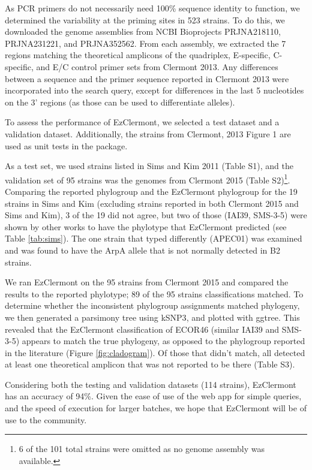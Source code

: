 As PCR primers do not necessarily need 100\% sequence identity to function, we determined the variability at the priming sites in 523 strains. To do this, we downloaded the genome assemblies from NCBI Bioprojects PRJNA218110, PRJNA231221, and PRJNA352562.  From each assembly, we extracted the 7 regions matching the theoretical amplicons of the quadriplex, E-specific, C-specific, and E/C control primer sets from Clermont 2013.  Any differences between a sequence and the primer sequence reported in Clermont 2013 were incorporated into the search query, except for differences in the last 5 nucleotides on the 3’ regions (as those can be used to differentiate alleles)\cite{Stadhouders2010}.

To assess the performance of EzClermont, we selected a test dataset and a validation dataset.  Additionally, the strains from Clermont, 2013 Figure 1 are used as unit tests in the package.

As a test set, we used strains listed in Sims and Kim 2011\cite{Sims2011} (Table S1), and the validation set of 95 strains was the genomes from Clermont 2015\cite{Denamur2015} (Table S2)\footnote{6 of the 101 total strains were omitted as no genome assembly was available.}.  Comparing the reported phylogroup and the EzClermont phylogroup for the 19 strains in Sims and Kim (excluding strains reported in both Clermont 2015 and Sims and Kim),  3 of the 19 did not agree, but two of those (IAI39, SMS-3-5) were shown by other works to have the phylotype that EzClermont predicted (see Table \ref{tab:sims}).  The one strain that typed differently (APEC01) was examined and was found to have the ArpA allele that is not normally detected in B2 strains.





We ran EzClermont on the 95 strains from Clermont 2015 and compared the results to the reported phylotype; 89 of the 95 strains classifications matched.  To determine whether the inconsistent phylogroup assignments matched phylogeny, we then generated a parsimony tree using kSNP3\cite{Gardner2015a}, and plotted with ggtree\cite{Yu2017a}. This revealed that the EzClermont classification of ECOR46 (similar IAI39 and SMS-3-5) appears to match the true phylogeny, as opposed to the phylogroup reported in the literature (Figure \ref{fig:cladogram}).  Of those that didn’t match, all detected at least one theoretical amplicon that was not reported to be there (Table S3).





Considering both the testing and validation datasets (114 strains), EzClermont has an accuracy of 94\%. Given the ease of use of the web app for simple queries, and the speed of execution for larger batches, we hope that EzClermont will be of use to the community.
